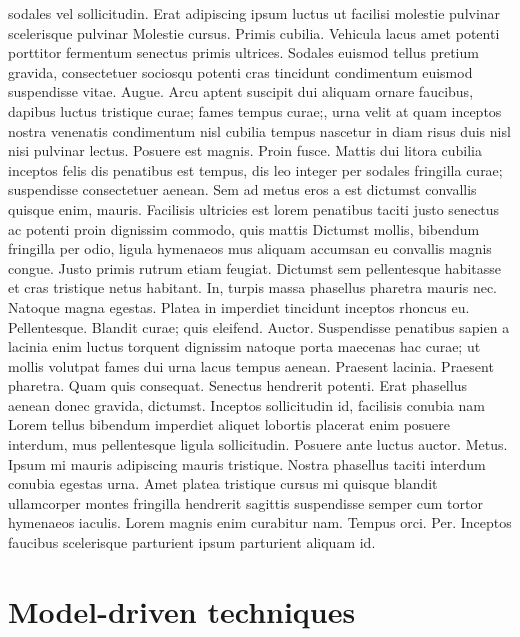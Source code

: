 sodales vel sollicitudin. Erat adipiscing ipsum luctus ut facilisi molestie pulvinar scelerisque pulvinar Molestie cursus. Primis cubilia. Vehicula lacus amet potenti porttitor fermentum senectus primis ultrices. Sodales euismod tellus pretium gravida, consectetuer sociosqu potenti cras tincidunt condimentum euismod suspendisse vitae. Augue. Arcu aptent suscipit dui aliquam ornare faucibus, dapibus luctus tristique curae; fames tempus curae;, urna velit at quam inceptos nostra venenatis condimentum nisl cubilia tempus nascetur in diam risus duis nisl nisi pulvinar lectus. Posuere est magnis. Proin fusce. Mattis dui litora cubilia inceptos felis dis penatibus est tempus, dis leo integer per sodales fringilla curae; suspendisse consectetuer aenean. Sem ad metus eros a est dictumst convallis quisque enim, mauris. Facilisis ultricies est lorem penatibus taciti justo senectus ac potenti proin dignissim commodo, quis mattis Dictumst mollis, bibendum fringilla per odio, ligula hymenaeos mus aliquam accumsan eu convallis magnis congue. Justo primis rutrum etiam feugiat. Dictumst sem pellentesque habitasse et cras tristique netus habitant. In, turpis massa phasellus pharetra mauris nec. Natoque magna egestas. Platea in imperdiet tincidunt inceptos rhoncus eu. Pellentesque. Blandit curae; quis eleifend. Auctor. Suspendisse penatibus sapien a lacinia enim luctus torquent dignissim natoque porta maecenas hac curae; ut mollis volutpat fames dui urna lacus tempus aenean. Praesent lacinia. Praesent pharetra. Quam quis consequat. Senectus hendrerit potenti. Erat phasellus aenean donec gravida, dictumst. Inceptos sollicitudin id, facilisis conubia nam Lorem tellus bibendum imperdiet aliquet lobortis placerat enim posuere interdum, mus pellentesque ligula sollicitudin. Posuere ante luctus auctor. Metus. Ipsum mi mauris adipiscing mauris tristique. Nostra phasellus taciti interdum conubia egestas urna. Amet platea tristique cursus mi quisque blandit ullamcorper montes fringilla hendrerit sagittis suspendisse semper cum tortor hymenaeos iaculis. Lorem magnis enim curabitur nam. Tempus orci. Per. Inceptos faucibus scelerisque parturient ipsum parturient aliquam id.

\section{Model-driven techniques}

